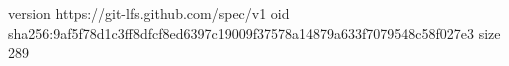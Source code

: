 version https://git-lfs.github.com/spec/v1
oid sha256:9af5f78d1c3ff8dfcf8ed6397c19009f37578a14879a633f7079548c58f027e3
size 289
